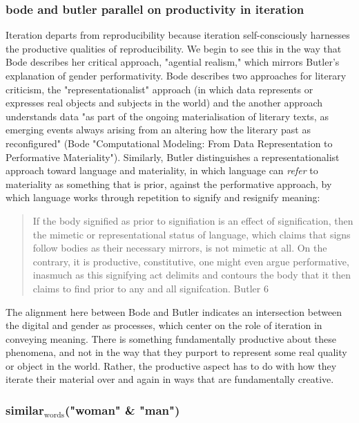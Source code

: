 \documentclass[11pt]{article}
\begin{document}
\subsubsection{bode and butler parallel on productivity in iteration}
\label{sec:orgb2ff8bf}
Iteration departs from reproducibility because iteration
self-consciously harnesses the productive qualities of
reproducibility. We begin to see this in the way that Bode describes
her critical approach, "agential realism," which mirrors Butler's
explanation of gender performativity. Bode describes two approaches
for literary criticism, the "representationalist" approach (in which
data represents or expresses real objects and subjects in the world)
and the another approach understands data "as part of the ongoing
materialisation of literary texts, as emerging events always arising
from an altering how the literary past as reconfigured" (Bode
"Computational Modeling: From Data Representation to Performative
Materiality"). Similarly, Butler distinguishes a representationalist
approach toward language and materiality, in which language can
\emph{refer} to materiality as something that is prior, against the
performative approach, by which language works through repetition to
signify and resignify meaning:
\begin{quote}
If the body signified as prior to signifiation is an effect of
signification, then the mimetic or representational status of
language, which claims that signs follow bodies as their necessary
mirrors, is not mimetic at all. On the contrary, it is productive,
constitutive, one might even argue performative, inasmuch as this
signifying act delimits and contours the body that it then claims to
find prior to any and all signifcation. Butler 6
\end{quote}
The alignment here between Bode and Butler indicates an intersection
between the digital and gender as processes, which center on the role
of iteration in conveying meaning. There is something fundamentally
productive about these phenomena, and not in the way that they purport
to represent some real quality or object in the world. Rather, the
productive aspect has to do with how they iterate their material over
and again in ways that are fundamentally creative.

\subsubsection{similar\(_{\text{words}}\)("woman" \& "man")}
\label{sec:org5289d51}
\end{document}
